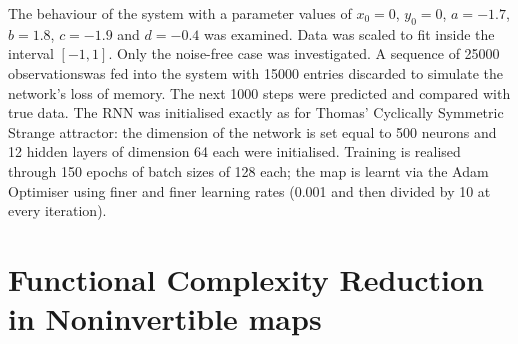 The behaviour of the system with a parameter values of $x_0=0$, $y_0=0$, $a = -1.7$,  $b = 1.8$, $c = -1.9$ and $d = -0.4$ was examined.
Data was scaled to fit inside the interval $[-1,1]$. Only the noise-free case was investigated. 
 A sequence of 25000 observationswas fed into the system with 15000 entries discarded to simulate the network's loss of memory. The next 1000 steps were predicted and compared with true data.
The RNN was initialised exactly as for Thomas' Cyclically Symmetric Strange attractor: the dimension of the network is set equal to 500 neurons and 12 hidden layers of dimension 64 each were initialised. Training is realised through 150 epochs of batch sizes of 128 each; the map is learnt via the Adam Optimiser using finer and finer learning rates (0.001 and then divided by 10 at every iteration).

\section{Functional Complexity Reduction in Noninvertible maps}




